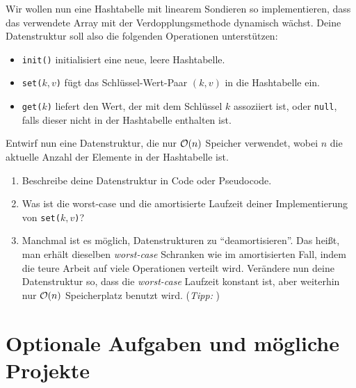 \documentclass{uebung_cs}
\begin{document}
\begin{exercise}
    Wir wollen nun eine Hashtabelle mit linearem Sondieren so implementieren, dass das verwendete Array mit der Verdopplungsmethode dynamisch wächst.
    Deine Datenstruktur soll also die folgenden Operationen unterstützen:
    \begin{itemize}
        \item \texttt{init()} initialisiert eine neue, leere Hashtabelle.
        \item \texttt{set($k,v$)} fügt das Schlüssel-Wert-Paar $(k,v)$ in die Hashtabelle ein.
        \item \texttt{get($k$)} liefert den Wert, der mit dem Schlüssel $k$ assoziiert ist, oder \texttt{null}, falls dieser nicht in der Hashtabelle enthalten ist.
    \end{itemize}
    Entwirf nun eine Datenstruktur, die nur $\mathcal{O}(n)$ Speicher verwendet, wobei $n$ die aktuelle Anzahl der Elemente in der Hashtabelle ist.
    \begin{enumerate}
        \item\athome Beschreibe deine Datenstruktur in Code oder Pseudocode.
        \item\athome Was ist die worst-case und die amortisierte Laufzeit deiner Implementierung von \texttt{set($k,v$)}?
        \item\atschool\note Manchmal ist es möglich, Datenstrukturen zu \enquote{deamortisieren}. Das heißt, man erhält dieselben \emph{worst-case} Schranken wie im amortisierten Fall, indem die teure Arbeit auf viele Operationen verteilt wird.
        Verändere nun deine Datenstruktur so, dass die \emph{worst-case} Laufzeit konstant ist, aber weiterhin nur $\mathcal{O}(n)$ Speicherplatz benutzt wird.
        (\emph{Tipp: })
    \end{enumerate}
\end{exercise}

\section*{Optionale Aufgaben und mögliche Projekte}
\end{document}
